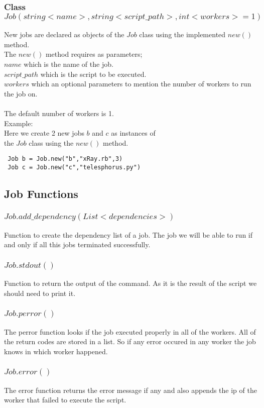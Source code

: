 \subsubsection*{Class $Job(string <name>, string <script\_path>, int <workers>=1)$}
New jobs are declared as objects of the $Job$ class using the implemented $new()$ method.\\
The $new()$ method requires as parameters;\\
$name$ which is the name of the job.\\
$script\_path$ which is the script to be executed.\\
$workers$ which an optional parameters to mention the number of workers to run the job on.\\\\
The default number of workers is 1.\\
Example:\\
Here we create 2 new jobs $b$ and $c$ as instances of \\the $Job$ class using the $new()$ method.
\begin{verbatim}
 Job b = Job.new("b","xRay.rb",3)
 Job c = Job.new("c","telesphorus.py")
\end{verbatim}
\subsection*{Job Functions}
\subsubsection*{$Job.add\_dependency(List <dependencies>)$}
Function to create the dependency list of a job. The job we will be
able to run if and only if all this jobs terminated successfully.
\subsubsection*{$Job.stdout()$}
Function to return the output of the command. As it is the result of the script we should need to print it.
\subsubsection*{$Job.perror()$}
The perror function looks if the job executed properly in all of the workers. All of the return codes are stored in a list. So if any error occured in any worker the job knows in which worker happened.
\subsubsection*{$Job.error()$}
The error function returns the error message if any and also appends the ip of the worker that failed to execute the script.
